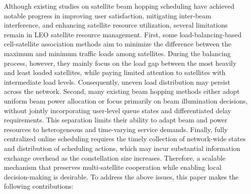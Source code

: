 \documentclass[journal]{IEEEtran}
\begin{document}
Although existing studies on satellite beam hopping scheduling have achieved notable progress in improving user satisfaction, mitigating inter-beam interference, and enhancing satellite resource utilization, several limitations remain in LEO satellite resource management. First, some load-balancing-based cell-satellite association methods aim to minimize the difference between the maximum and minimum traffic loads among satellites. During the balancing process, however, they mainly focus on the load gap between the most heavily and least loaded satellites, while paying limited attention to satellites with intermediate load levels. Consequently, uneven load distribution may persist across the network. Second, many existing beam hopping methods either adopt uniform beam power allocation or focus primarily on beam illumination decisions, without jointly incorporating user-level queue states and differentiated delay requirements. This separation limits their ability to adapt beam and power resources to heterogeneous and time-varying service demands. Finally, fully centralized online scheduling requires the timely collection of network-wide states and distribution of scheduling actions, which may incur substantial information exchange overhead as the constellation size increases. Therefore, a scalable mechanism that preserves multi-satellite cooperation while enabling local decision-making is desirable. To address the above issues, this paper makes the following contributions:
\end{document}
